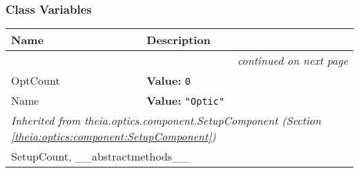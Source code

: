 
  \subsubsection{Class Variables}

    \vspace{-1cm}
\hspace{\varindent}\begin{longtable}{|p{\varnamewidth}|p{\vardescrwidth}|l}
\cline{1-2}
\cline{1-2} \centering \textbf{Name} & \centering \textbf{Description}& \\
\cline{1-2}
\endhead\cline{1-2}\multicolumn{3}{r}{\small\textit{continued on next page}}\\\endfoot\cline{1-2}
\endlastfoot\raggedright O\-p\-t\-C\-o\-u\-n\-t\- & \raggedright \textbf{Value:} 
{\tt 0}&\\
\cline{1-2}
\raggedright N\-a\-m\-e\- & \raggedright \textbf{Value:} 
{\tt "Optic"}&\\
\cline{1-2}
\multicolumn{2}{|l|}{\textit{Inherited from theia.optics.component.SetupComponent \textit{(Section \ref{theia:optics:component:SetupComponent})}}}\\
\multicolumn{2}{|p{\varwidth}|}{\raggedright SetupCount, \_\_abstractmethods\_\_}\\
\cline{1-2}
\end{longtable}

